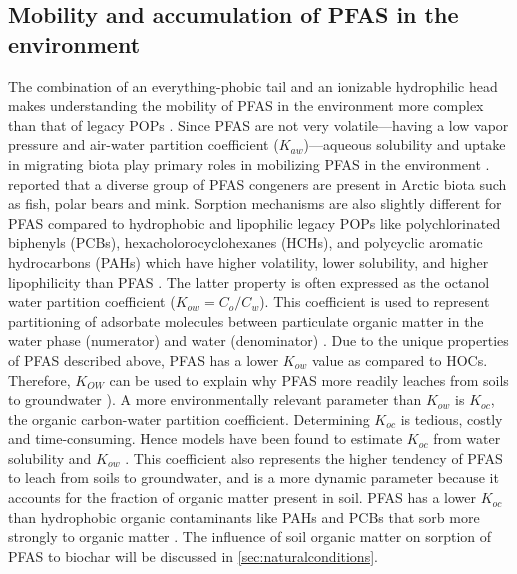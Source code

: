 \subsection{Mobility and accumulation of PFAS in the environment}
The combination of an everything-phobic tail and an ionizable hydrophilic head makes understanding the mobility of PFAS in the environment more complex than that of legacy POPs \citep{cabrerizo2018legacy,Arp2006}. Since PFAS are not very volatile---having a low vapor pressure and air-water partition coefficient ($K_{aw}$)---aqueous solubility and uptake in migrating biota play primary roles in mobilizing PFAS in the environment \citep{Arp2006}. \cite{Schlabach2017} reported that a diverse group of PFAS congeners are present in Arctic biota such as fish, polar bears and mink. Sorption mechanisms are also slightly different for PFAS compared to hydrophobic and lipophilic legacy POPs like polychlorinated biphenyls (PCBs), hexacholorocyclohexanes (HCHs), and polycyclic aromatic hydrocarbons (PAHs) which have higher volatility, lower solubility, and higher lipophilicity than PFAS \citep{cabrerizo2018legacy, Cornelissen2005,li2018}. The latter property is often expressed as the octanol water partition coefficient (\(K_{ow} = C_{o}/C_w\)). This coefficient is used to represent partitioning of adsorbate molecules between particulate organic matter in the water phase (numerator) and water (denominator) \citep{Reemtsma2016}. Due to the unique properties of PFAS described above, PFAS has a lower \(K_{ow}\) value as compared to HOCs. Therefore, \(K_{OW}\) can be used to explain why PFAS more readily leaches from soils to groundwater \citep{Cornelissen2005,du2014adsorption}). A more environmentally relevant parameter than \(K_{ow}\) is \(K_{oc}\), the organic carbon-water partition coefficient. Determining \(K_{oc}\) is tedious, costly and time-consuming. Hence models have been found to estimate \(K_{oc}\) from water solubility and \(K_{ow}\) \citep{pandey2021qspr}. This coefficient also represents the higher tendency of PFAS to leach from soils to groundwater, and is a more dynamic parameter because it accounts for the fraction of organic matter present in soil. PFAS has a lower \(K_{oc}\) than hydrophobic organic contaminants like PAHs and PCBs that sorb more strongly to organic matter \citep{Cornelissen2005}. The influence of soil organic matter on sorption of PFAS to biochar will be discussed in \cref{sec:naturalconditions}.  


